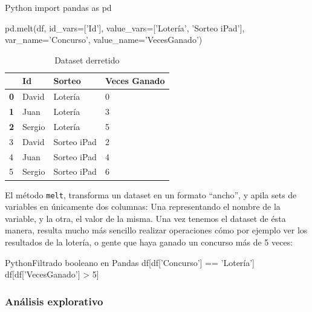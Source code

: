 \begin{TMcode}{Python}{}{}
import pandas as pd

pd.melt(df, id_vars=['Id'], value_vars=['Lotería', 'Sorteo iPad'],
        var_name='Concurso', value_name='VecesGanado')

\end{TMcode}
\vspace{1cm}

\begin{table}[ht!]
\centering
\caption{Dataset derretido}
\label{dataset-derretido}
\begin{tabular}{|l|l|l|l|}
\hline
           & \textbf{Id} & \textbf{Sorteo} & \textbf{Veces Ganado} \\ \hline
\textbf{0} & David       & Lotería         & 0                     \\ \hline
\textbf{1} & Juan        & Lotería         & 3                     \\ \hline
\textbf{2} & Sergio      & Lotería         & 5                     \\ \hline
3          & David       & Sorteo iPad     & 2                     \\ \hline
4          & Juan        & Sorteo iPad     & 4                     \\ \hline
5          & Sergio      & Sorteo iPad     & 6                     \\ \hline
\end{tabular}
\end{table}

El método \texttt{melt}, transforma un dataset en un formato ``ancho'', y apila
sets de variables en únicamente dos columnas: Una representando el nombre de la
variable, y la otra, el valor de la misma. Una vez tenemos el dataset de ésta
manera, resulta mucho más sencillo realizar operaciones cómo por ejemplo ver los
resultados de la lotería, o gente que haya ganado un concurso más de 5 veces:

\begin{TMcode}{Python}{}{Filtrado booleano en Pandas}
  df[df['Concurso'] == 'Lotería']
  df[df['VecesGanado'] > 5]
\end{TMcode}

\subsubsection{Análisis explorativo}
\label{subsec:state_dataScience_workflow_2}

